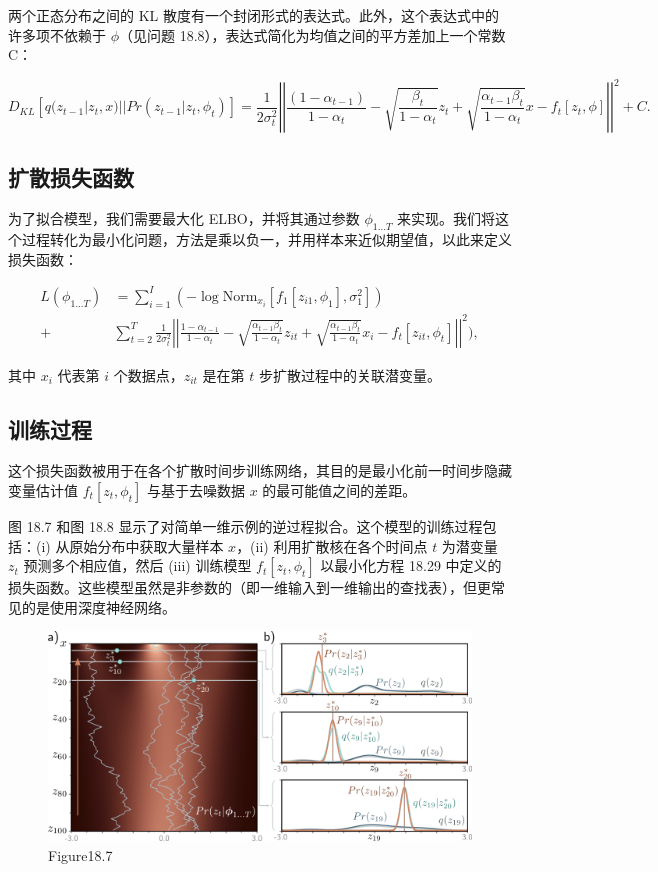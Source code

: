 两个正态分布之间的 KL 散度有一个封闭形式的表达式。此外，这个表达式中的许多项不依赖于 \(\phi\)（见问题 18.8），表达式简化为均值之间的平方差加上一个常数 C：

\begin{equation}
D_{KL} \left[ q(z_{t-1}|z_t, x)||Pr(z_{t-1}|z_t, \phi_t) \right] = \frac{1}{2\sigma^2_t} \left| \left| \frac{(1 - \alpha_{t-1})}{1 - \alpha_t} - \sqrt{\frac{\beta_t}{1 - \alpha_t}} z_t + \sqrt{\frac{\alpha_{t-1}\beta_t}{1 - \alpha_t}} x - f_t[z_t, \phi] \right| \right|^2 + C. 
\end{equation}

\subsection{扩散损失函数}
为了拟合模型，我们需要最大化 ELBO，并将其通过参数 \(\phi_{1...T}\) 来实现。我们将这个过程转化为最小化问题，方法是乘以负一，并用样本来近似期望值，以此来定义损失函数：


\begin{align}
L(\phi_{1...T}) &= \sum_{i=1}^I \left( -\log \text{Norm}_{x_i} [f_1[z_{i1}, \phi_1], \sigma^2_{1}] \right) \\ 
+ &\sum_{t=2}^T \frac{1}{2\sigma^2_t} \left| \left| \frac{1 - \alpha_{t-1}}{1 - \alpha_t} - \sqrt{\frac{\alpha_{t-1}\beta_t}{1 - \alpha_t}} z_{it} + \sqrt{\frac{\alpha_{t-1}\beta_t}{1 - \alpha_t}} x_i - f_t[z_{it}, \phi_t] \right| \right|^2), 
\end{align} 



其中 \(x_i\) 代表第 \(i\) 个数据点，\(z_{it}\) 是在第 \(t\) 步扩散过程中的关联潜变量。

\subsection{训练过程}
这个损失函数被用于在各个扩散时间步训练网络，其目的是最小化前一时间步隐藏变量估计值 \(f_t[z_t, \phi_t]\) 与基于去噪数据 \(x\) 的最可能值之间的差距。

图 18.7 和图 18.8 显示了对简单一维示例的逆过程拟合。这个模型的训练过程包括：(i) 从原始分布中获取大量样本 \(x\)，(ii) 利用扩散核在各个时间点 \(t\) 为潜变量 \(z_t\) 预测多个相应值，然后 (iii) 训练模型 \(f_t[z_t, \phi_t]\) 以最小化方程 18.29 中定义的损失函数。这些模型虽然是非参数的（即一维输入到一维输出的查找表），但更常见的是使用深度神经网络。

\begin{figure}[ht!]
\centering
\includegraphics[width=0.7\linewidth]{png/chapter18/DiffusionPredict.png}
\caption{Figure18.7}
\end{figure}

